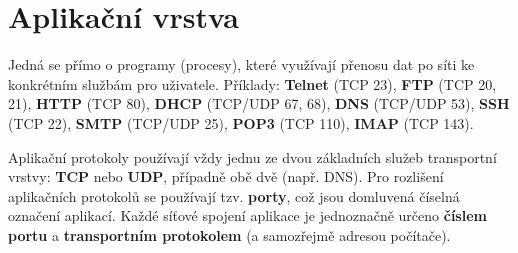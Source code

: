 \noindent{}

\section{Aplikační vrstva}
Jedná se přímo o programy (procesy), které využívají přenosu dat po síti ke konkrétním službám pro uživatele. Příklady: \textbf{Telnet} (TCP 23), \textbf{FTP} (TCP 20, 21), \textbf{HTTP} (TCP 80), \textbf{DHCP} (TCP/UDP 67, 68), \textbf{DNS} (TCP/UDP 53), \textbf{SSH} (TCP 22), \textbf{SMTP} (TCP/UDP 25), \textbf{POP3} (TCP 110), \textbf{IMAP} (TCP 143).

Aplikační protokoly používají vždy jednu ze dvou základních služeb transportní vrstvy: \textbf{TCP} nebo \textbf{UDP}, případně obě dvě (např. DNS). Pro rozlišení aplikačních protokolů se používají tzv. \textbf{porty}, což jsou domluvená číselná označení aplikací. Každé síťové spojení aplikace je jednoznačně určeno \textbf{číslem portu} a \textbf{transportním protokolem} (a samozřejmě adresou počítače).